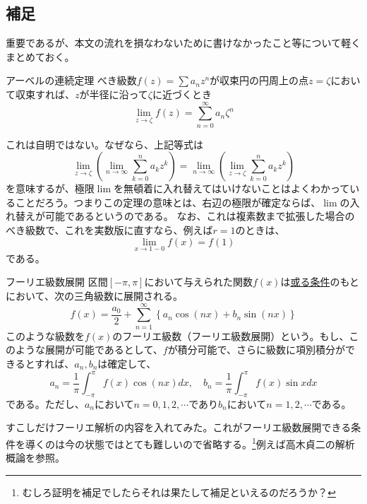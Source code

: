 \documentclass[a4j,dvipdfmx]{jsarticle}
\begin{document}
            \subsection{補足}
                重要であるが、本文の流れを損なわないために書けなかったこと等について軽くまとめておく。
                \begin{itembox}{アーベルの連続定理}
                    べき級数$f(z)=\sum a_nz^n$が収束円の円周上の点$z=\zeta$において収束すれば、$z$が半径に沿って$\zeta$に近づくとき
                    \begin{equation}
                        \lim_{z\to\zeta}f(z)=\sum_{n=0}^{\infty}a_n\zeta^n
                    \end{equation}
                \end{itembox}
                これは自明ではない。なぜなら、上記等式は
                \begin{equation*}
                    \lim_{z\to\zeta}\left(\lim_{n\to\infty}\sum_{k=0}^{n}a_kz^{k}\right)=\lim_{n\to\infty}\left(\lim_{z\to\zeta}\sum_{k=0}^{n}a_kz^{k}\right)
                \end{equation*}
                を意味するが、極限$\lim$を無頓着に入れ替えてはいけないことはよくわかっていることだろう。つまりこの定理の意味とは、右辺の極限が確定ならば、$\lim$の入れ替えが可能であるというのである。
                なお、これは複素数まで拡張した場合のべき級数で、これを実数版に直すなら、例えば$r=1$のときは、
                \begin{equation*}
                    \lim_{x\to 1-0}f(x)=f(1)
                \end{equation*}
                である。\\

                \begin{itembox}{フーリエ級数展開}
                    区間$[-\pi,\pi]$において与えられた関数$f(x)$は\underline{或る条件}のもとにおいて、次の三角級数に展開される。
                    \begin{equation}
                        f(x)=\frac{a_0}{2}+\sum_{n=1}^{\infty}\left\{a_n\cos(nx)+b_n\sin(nx)\right\}\label{eq:フーリエ級数}
                    \end{equation}
                    このような級数を$f(x)$のフーリエ級数（フーリエ級数展開）という。もし、このような展開が可能であるとして、$f$が積分可能で、さらに級数に項別積分ができるとすれば、$a_n,b_n$は確定して、
                    \begin{equation*}
                        a_n=\frac{1}{\pi}\int_{-\pi}^{\pi}f(x)\cos(nx)dx,\quad b_n=\frac{1}{\pi}\int_{-\pi}^{\pi}f(x)\sin xdx
                    \end{equation*}
                    である。ただし、$a_n$において$n=0,1,2,\cdots$であり$b_n$において$n=1,2,\cdots$である。
                \end{itembox}
                すこしだけフーリエ解析の内容を入れてみた。これがフーリエ級数展開できる条件を導くのは今の状態ではとても難しいので省略する。\footnote{むしろ証明を補足でしたらそれは果たして補足といえるのだろうか？}例えば高木貞二の解析概論を参照。
\end{document}
